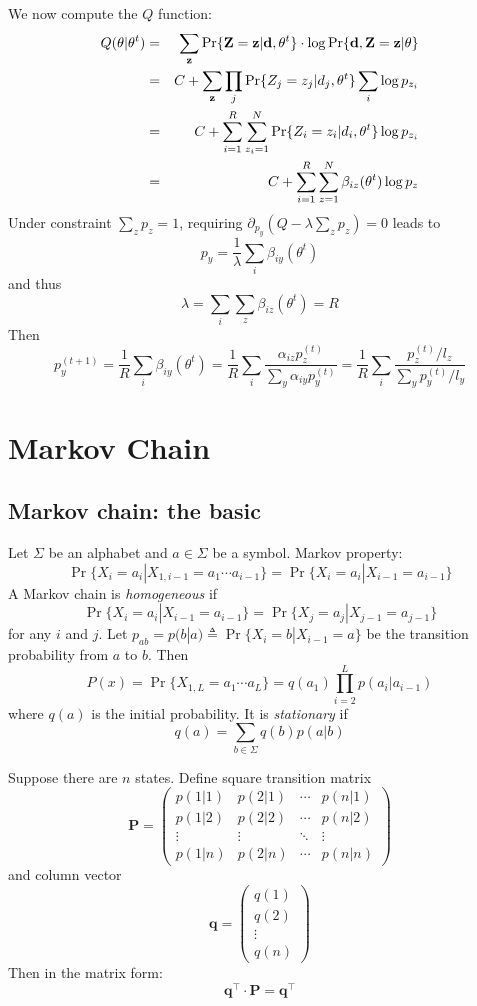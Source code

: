\documentclass[10pt]{article}
\begin{document}
We now compute the $Q$ function:
\begin{eqnarray*}
Q(\theta|\theta^t)&=&\sum_{{\bf z}}\Pr\{{\bf Z}={\bf z}|{\bf d},\theta^t\}\cdot\log\Pr\{{\bf d},{\bf Z}={\bf z}|\theta\}\\
&=&C+\sum_{{\bf z}}\prod_j\Pr\{Z_j=z_j|d_j,\theta^t\}\sum_i\log p_{z_i}\\
&=&C+\sum_{i=1}^R\sum_{z_i=1}^N\Pr\{Z_i=z_i|d_i,\theta^t\}\log p_{z_i}\\
&=&C+\sum_{i=1}^R\sum_{z=1}^N\beta_{iz}(\theta^t)\log p_z
\end{eqnarray*}
Under constraint $\sum_zp_z=1$, requiring
$\partial_{p_y}(Q-\lambda\sum_zp_z)=0$ leads to
\[
p_y=\frac{1}{\lambda}\sum_i\beta_{iy}(\theta^t)
\]
and thus
\[
\lambda=\sum_i\sum_z\beta_{iz}(\theta^t)=R
\]
Then
\[
p_y^{(t+1)}=\frac{1}{R}\sum_i\beta_{iy}(\theta^t)=\frac{1}{R}\sum_i\frac{\alpha_{iz}p^{(t)}_z}{\sum_{y}\alpha_{iy}p^{(t)}_y}=\frac{1}{R}\sum_i\frac{p_z^{(t)}/l_z}{\sum_yp_y^{(t)}/l_y}
\]
\section{Markov Chain}

\subsection{Markov chain: the basic}
Let $\Sigma$ be an alphabet and $a\in\Sigma$ be a symbol. Markov property:
$$
\Pr\{X_i=a_i|X_{1,i-1}=a_1\cdots a_{i-1}\}=\Pr\{X_i=a_i|X_{i-1}=a_{i-1}\}
$$
A Markov chain is \emph{homogeneous} if
$$
\Pr\{X_i=a_i|X_{i-1}=a_{i-1}\}=\Pr\{X_j=a_j|X_{j-1}=a_{j-1}\}
$$
for any $i$ and $j$. Let $p_{ab}=p(b|a)\triangleq\Pr\{X_i=b|X_{i-1}=a\}$ be the
transition probability from $a$ to $b$. Then
$$
P(x)=\Pr\{X_{1,L}=a_1\cdots a_L\}=q(a_1)\prod_{i=2}^Lp(a_i|a_{i-1})
$$
where $q(a)$ is the initial probability. It is \emph{stationary} if
$$
q(a)=\sum_{b\in\Sigma} q(b)p(a|b)
$$

Suppose there are $n$ states. Define square transition matrix
$$
\mathbf{P}=\left(\begin{array}{cccc}
p(1|1) & p(2|1) & \cdots & p(n|1) \\
p(1|2) & p(2|2) & \cdots & p(n|2) \\
\vdots & \vdots & \ddots & \vdots \\
p(1|n) & p(2|n) & \cdots & p(n|n)
\end{array}\right)
$$
and column vector
$$
\mathbf{q}=\left(\begin{array}{c}
q(1) \\
q(2) \\
\vdots\\
q(n)
\end{array}\right)
$$
Then in the matrix form:
$$
\mathbf{q}^\intercal\cdot\mathbf{P}=\mathbf{q}^\intercal
$$
\end{document}
